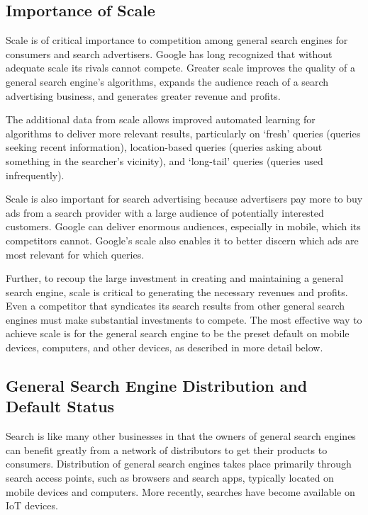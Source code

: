 \documentclass[11pt,b5paper,headings=small]{scrartcl}
\begin{document}
\subsection{Importance of Scale}


Scale is of critical importance to competition among general search engines for
consumers and search advertisers. Google has long recognized that without adequate scale its
rivals cannot compete. Greater scale improves the quality of a general search engine’s
algorithms, expands the audience reach of a search advertising business, and generates greater
revenue and profits.


The additional data from scale allows improved automated learning for algorithms
to deliver more relevant results, particularly on `fresh' queries (queries seeking recent
information), location-based queries (queries asking about something in the searcher's vicinity),
and `long-tail' queries (queries used infrequently).


Scale is also important for search advertising because advertisers pay more to buy
ads from a search provider with a large audience of potentially interested customers. Google can
deliver enormous audiences, especially in mobile, which its competitors cannot. Google’s scale
also enables it to better discern which ads are most relevant for which queries.


Further, to recoup the large investment in creating and maintaining a general
search engine, scale is critical to generating the necessary revenues and profits. Even a
competitor that syndicates its search results from other general search engines must make
substantial investments to compete. The most effective way to achieve scale is for the general
search engine to be the preset default on mobile devices, computers, and other devices, as
described in more detail below.

\subsection{
General Search Engine Distribution and Default Status}


Search is like many other businesses in that the owners of general search engines
can benefit greatly from a network of distributors to get their products to consumers. Distribution
of general search engines takes place primarily through search access points, such as browsers
and search apps, typically located on mobile devices and computers. More recently, searches
have become available on IoT devices.
\end{document}

